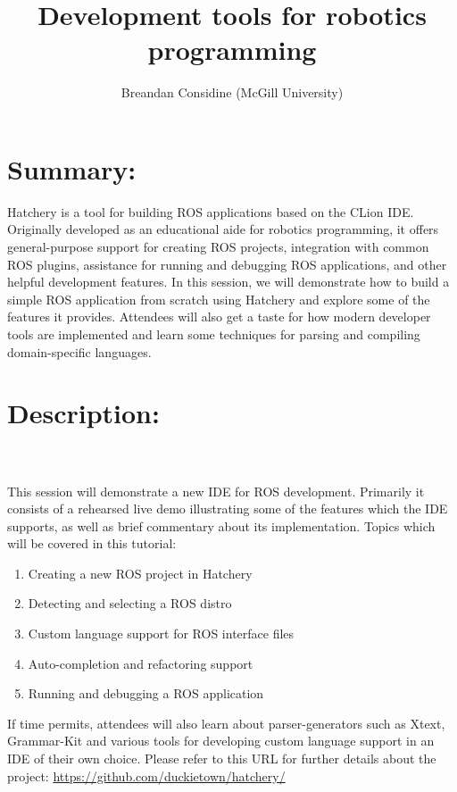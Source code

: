 \documentclass[12pt]{article}
\date{}
\begin{document}
\title{Development tools for robotics programming}
\author{Breandan Considine (McGill University)}
\maketitle

\section*{Summary:}
Hatchery is a tool for building ROS applications based on the CLion IDE. Originally developed as an educational aide for robotics programming, it offers general-purpose support for creating ROS projects, integration with common ROS plugins, assistance for running and debugging ROS applications, and other helpful development features. In this session, we will demonstrate how to build a simple ROS application from scratch using Hatchery and explore some of the features it provides. Attendees will also get a taste for how modern developer tools are implemented and learn some techniques for parsing and compiling domain-specific languages.
\section*{Description:} \\\\
%
This session will demonstrate a new IDE for ROS development. Primarily it consists of a rehearsed live demo illustrating some of the features which the IDE supports, as well as brief commentary about its implementation. Topics which will be covered in this tutorial:
%
\begin{enumerate}
    \item Creating a new ROS project in Hatchery
    \item Detecting and selecting a ROS distro
    \item Custom language support for ROS interface files
    \item Auto-completion and refactoring support
    \item Running and debugging a ROS application
\end{enumerate}

\noindent If time permits, attendees will also learn about parser-generators such as Xtext, Grammar-Kit and various tools for developing custom language support in an IDE of their own choice.
%
\noindent Please refer to this URL for further details about the project: \url{https://github.com/duckietown/hatchery/}
\end{document}
